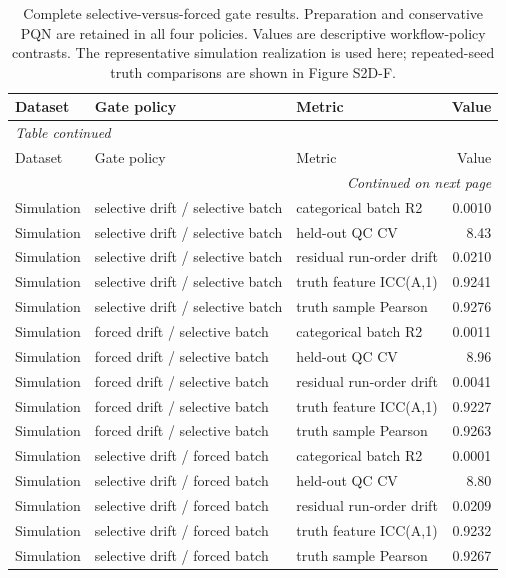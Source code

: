 \tiny
\begin{longtable}{lllr}
\caption{Complete selective-versus-forced gate results. Preparation and conservative PQN are retained in all four policies. Values are descriptive workflow-policy contrasts. The representative simulation realization is used here; repeated-seed truth comparisons are shown in Figure S2D-F.}\label{tab:supp_selective_forced}\\
\toprule
Dataset & Gate policy & Metric & Value \\
\midrule
\endfirsthead
\multicolumn{4}{l}{\textit{Table \thetable{} continued}}\\
\toprule
Dataset & Gate policy & Metric & Value \\
\midrule
\endhead
\midrule
\multicolumn{4}{r}{\textit{Continued on next page}}\\
\endfoot
\bottomrule
\endlastfoot
Simulation & selective drift / selective batch & categorical batch R2 & 0.0010 \\
Simulation & selective drift / selective batch & held-out QC CV & 8.43 \\
Simulation & selective drift / selective batch & residual run-order drift & 0.0210 \\
Simulation & selective drift / selective batch & truth feature ICC(A,1) & 0.9241 \\
Simulation & selective drift / selective batch & truth sample Pearson & 0.9276 \\
Simulation & forced drift / selective batch & categorical batch R2 & 0.0011 \\
Simulation & forced drift / selective batch & held-out QC CV & 8.96 \\
Simulation & forced drift / selective batch & residual run-order drift & 0.0041 \\
Simulation & forced drift / selective batch & truth feature ICC(A,1) & 0.9227 \\
Simulation & forced drift / selective batch & truth sample Pearson & 0.9263 \\
Simulation & selective drift / forced batch & categorical batch R2 & 0.0001 \\
Simulation & selective drift / forced batch & held-out QC CV & 8.80 \\
Simulation & selective drift / forced batch & residual run-order drift & 0.0209 \\
Simulation & selective drift / forced batch & truth feature ICC(A,1) & 0.9232 \\
Simulation & selective drift / forced batch & truth sample Pearson & 0.9267 \\

\end{longtable}
